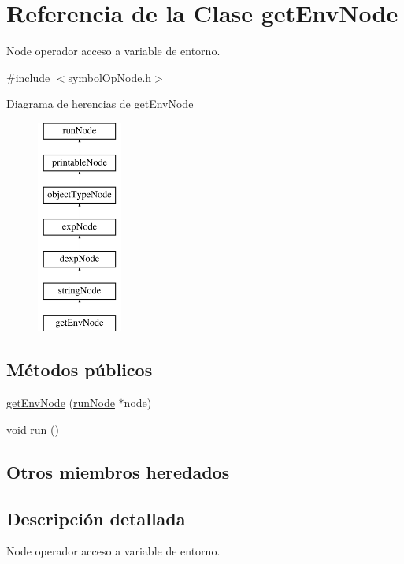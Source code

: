 \hypertarget{classgetEnvNode}{\section{Referencia de la Clase get\-Env\-Node}
\label{classgetEnvNode}
}


Node operador acceso a variable de entorno.  




{\ttfamily \#include $<$symbol\-Op\-Node.\-h$>$}

Diagrama de herencias de get\-Env\-Node\begin{figure}[H]
\begin{center}
\leavevmode
\includegraphics[height=7.000000cm]{classgetEnvNode}
\end{center}
\end{figure}
\subsection*{Métodos públicos}
\begin{DoxyCompactItemize}
\item 
\hyperlink{classgetEnvNode_ae8842f8ee50466b6d048e22d6eef9aa3}{get\-Env\-Node} (\hyperlink{classrunNode}{run\-Node} $\ast$node)
\item 
void \hyperlink{classgetEnvNode_afb268b8afbddf595a70be3338405c4e9}{run} ()
\end{DoxyCompactItemize}
\subsection*{Otros miembros heredados}


\subsection{Descripción detallada}
Node operador acceso a variable de entorno. 

